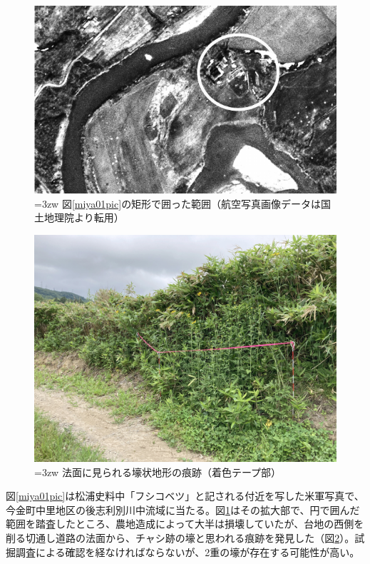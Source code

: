 \documentclass[a4j,11pt,twocolumn,openany]{jsbook}
\begin{document}
\begin{figure}[ht]
	\centering
	\includegraphics[width=\linewidth]{fig/05_Miyamoto/pic02.pdf}
	\caption{\hangindent=3zw
		図\ref{miya01pic}の矩形で囲った範囲（航空写真画像データは国土地理院より転用）}
	\label{miya02pic}
	\vspace{-\baselineskip}
\end{figure}

\begin{figure}[ht]
	\centering
	\includegraphics[width=\linewidth]{fig/05_Miyamoto/pic03.jpg}
	\caption{\hangindent=3zw
		法面に見られる壕状地形の痕跡（着色テープ部）}
	\label{miya03pic}
	\vspace{-\baselineskip}
\end{figure}

図\ref{miya01pic}は松浦史料中「フシコベツ」と記される付近を写した米軍写真で、今金町中里地区の後志利別川中流域に当たる。図\ref{miya02pic}はその拡大部で、円で囲んだ範囲を踏査したところ、農地造成によって大半は損壊していたが、台地の西側を削る切通し道路の法面から、チャシ跡の壕と思われる痕跡を発見した（図\ref{miya03pic}）。試掘調査による確認を経なければならないが、2重の壕が存在する可能性が高い。
\end{document}
